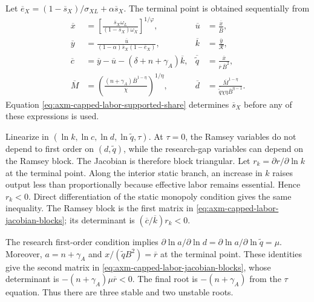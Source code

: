 Let \(\overline e_X=(1-\overline s_X)/\sigma_{XL}
+\alpha\overline s_X\). The terminal point is obtained sequentially from
\begin{align*}
 \overline x
 &=\left[
  \frac{\overline s_X\omega_L}
  {(1-\overline s_X)\omega_X}
 \right]^{1/\varphi},&
 \overline u&=\frac{\overline x}{\overline B},\\
 \overline y
 &=\frac{\overline u}
 {(1-\alpha)\overline s_X(1-\overline e_X)},&
 \overline k&=\frac{\overline y}{\mathcal R},\\
 \overline c
 &=\overline y-\overline u-(\delta+n+\gamma_A)\overline k,&
 \overline{\widetilde q}
 &=\frac{\overline x}{\overline r\,\overline B^2},\\
 \overline M
 &=\left(\frac{(n+\gamma_A)\overline B^{1-\eta}}{\chi}\right)^{1/\eta},&
 \overline d
 &=\frac{\overline M^{1-\eta}}
 {\overline{\widetilde q}\chi\eta\overline B^{\eta-1}}.
\end{align*}
Equation \eqref{eq:axm-capped-labor-supported-share} determines
\(\overline s_X\) before any of these expressions is used.

Linearize in
\((\ln k,\ln c,\ln d,\ln\widetilde q,\tau)\). At \(\tau=0\), the Ramsey
variables do not depend to first order on \((d,\widetilde q)\), while the
research-gap variables can depend on the Ramsey block. The Jacobian is
therefore block triangular. Let
\(r_k=\partial r/\partial\ln k\) at the terminal point. Along the interior
static branch, an increase in \(k\) raises output less than proportionally
because effective labor remains essential. Hence \(r_k<0\). Direct
differentiation of the static monopoly condition gives the same inequality.
The Ramsey block is the first matrix in
\eqref{eq:axm-capped-labor-jacobian-blocks}; its determinant is
\((\overline c/\overline k)r_k<0\).

The research first-order condition implies
\(\partial\ln a/\partial\ln d
=\partial\ln a/\partial\ln\widetilde q=\mu\). Moreover,
\(a=n+\gamma_A\) and
\(x/(\widetilde qB^2)=\overline r\) at the terminal point. These identities
give the second matrix in
\eqref{eq:axm-capped-labor-jacobian-blocks}, whose determinant is
\(-(n+\gamma_A)\mu\overline r<0\). The final root is
\(-(n+\gamma_A)\) from the
\(\tau\) equation. Thus there are three stable and two unstable roots.

